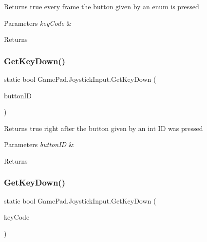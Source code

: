Returns true every frame the button given by an enum is pressed 


\begin{DoxyParams}{Parameters}
{\em key\+Code} & \\
\hline
\end{DoxyParams}
\begin{DoxyReturn}{Returns}

\end{DoxyReturn}
\mbox{\label{class_game_pad_1_1_joystick_input_a9a0249a7226ddcd8262286ea78728528}} 
\subsubsection{\texorpdfstring{GetKeyDown()}{GetKeyDown()}\hspace{0.1cm}{\footnotesize\ttfamily [1/2]}}
{\footnotesize\ttfamily static bool Game\+Pad.\+Joystick\+Input.\+Get\+Key\+Down (\begin{DoxyParamCaption}\item[{int}]{button\+ID }\end{DoxyParamCaption})\hspace{0.3cm}{\ttfamily [static]}}



Returns true right after the button given by an int ID was pressed 


\begin{DoxyParams}{Parameters}
{\em button\+ID} & \\
\hline
\end{DoxyParams}
\begin{DoxyReturn}{Returns}

\end{DoxyReturn}
\mbox{\label{class_game_pad_1_1_joystick_input_ae60ae4f44c406c04aa018a8f78ea1e2b}} 
\subsubsection{\texorpdfstring{GetKeyDown()}{GetKeyDown()}\hspace{0.1cm}{\footnotesize\ttfamily [2/2]}}
{\footnotesize\ttfamily static bool Game\+Pad.\+Joystick\+Input.\+Get\+Key\+Down (\begin{DoxyParamCaption}\item[{\mbox{\hyperlink{namespace_game_pad_ac76b16e8c3ac78facd993c355ab2c337}{Joystick\+Key\+Code}}}]{key\+Code }\end{DoxyParamCaption})\hspace{0.3cm}{\ttfamily [static]}}




